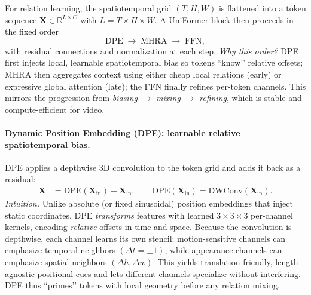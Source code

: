 \begin{enrichment}
\begin{enrichment}
        For relation learning, the spatiotemporal grid \((T,H,W)\) is flattened into a token sequence \(\bm{X}\in\mathbb{R}^{L\times C}\) with \(L=T\!\times\!H\!\times\!W\). A UniFormer block then proceeds in the fixed order
        \[
        \text{DPE} \;\longrightarrow\; \text{MHRA} \;\longrightarrow\; \text{FFN},
        \]
        with residual connections and normalization at each step. \emph{Why this order?} DPE first injects local, learnable spatiotemporal bias so tokens ``know’’ relative offsets; MHRA then aggregates context using either cheap local relations (early) or expressive global attention (late); the FFN finally refines per-token channels. This mirrors the progression from \emph{biasing} \(\to\) \emph{mixing} \(\to\) \emph{refining}, which is stable and compute-efficient for video.
        
        \paragraph{Dynamic Position Embedding (DPE): learnable relative spatiotemporal bias.}
        DPE applies a depthwise 3D convolution to the token grid and adds it back as a residual:
        \begin{align}
            \bm{X} &= \mathrm{DPE}(\bm{X}_{\text{in}}) + \bm{X}_{\text{in}}, \qquad
            \mathrm{DPE}(\bm{X}_{\text{in}})=\mathrm{DWConv}(\bm{X}_{\text{in}}).
            \label{eq:uni_dpe_def}
        \end{align}
        \emph{Intuition.} Unlike absolute (or fixed sinusoidal) position embeddings that inject static coordinates, DPE \emph{transforms} features with learned \(3{\times}3{\times}3\) per-channel kernels, encoding \emph{relative} offsets in time and space. Because the convolution is depthwise, each channel learns its own stencil: motion-sensitive channels can emphasize temporal neighbors \((\Delta t=\pm 1)\), while appearance channels can emphasize spatial neighbors \((\Delta h,\Delta w)\). This yields translation-friendly, length-agnostic positional cues and lets different channels specialize without interfering. DPE thus “primes’’ tokens with local geometry before any relation mixing.
        

\end{enrichment}
\end{enrichment}

